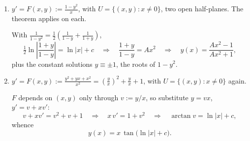 \begin{exercisesolution}
\begin{enumerate}[label=\textbf{(\alph*)}]
    Here $\frac{1}{1-e^y} = 1 + \frac{e^y}{1-e^y}$, so
    $\int\frac{dy}{1-e^y} = y - \ln\lvert 1-e^y\rvert$ and
    \[\ln\left\lvert\frac{e^y}{1-e^y}\right\rvert = x + c
      \quad\Longrightarrow\quad \frac{e^y}{1-e^y} = A e^{x}
      \quad\Longrightarrow\quad e^y = \frac{Ae^x}{1+Ae^x},\]
    that is
    \[y(x) = x + \ln\lvert A\rvert - \ln\!\big\lvert 1 + Ae^{x}\big\rvert,\]
    together with the constant solution $y \equiv 0$, the root of $1-e^y$. The sign of $A$
    selects the branch: $A > 0$ gives the solutions lying below the equilibrium, defined for
    every $x$, and $A < 0$ those lying above it, defined for $x > -\ln\lvert A\rvert$ and blowing
    up as $x$ descends to that endpoint. In both cases $y \to 0$ as $x \to \infty$, from below
    in the first and from above in the second, which the formula shows directly, since
    $\ln\lvert 1+Ae^x\rvert - x - \ln\lvert A\rvert \to 0$.

  \item $\displaystyle y' = F(x,y) := \frac{1-y^2}{x}$, with $U = \{(x,y) : x \neq 0\}$, two
    open half-planes. The theorem applies on each.

    With $\frac{1}{1-y^2} = \frac12\left(\frac{1}{1-y}+\frac{1}{1+y}\right)$,
    \[\tfrac12\ln\left\lvert\frac{1+y}{1-y}\right\rvert = \ln\lvert x\rvert + c
      \quad\Longrightarrow\quad \frac{1+y}{1-y} = A x^2
      \quad\Longrightarrow\quad y(x) = \frac{Ax^2-1}{Ax^2+1},\]
    plus the constant solutions $y \equiv \pm1$, the roots of $1-y^2$.

  \item $\displaystyle y' = F(x,y) := \frac{y^2+yx+x^2}{x^2}
      = \left(\frac{y}{x}\right)^{2} + \frac{y}{x} + 1$, with
    $U = \{(x,y) : x \neq 0\}$ again.

    $F$ depends on $(x,y)$ only through $v := y/x$, so substitute $y = vx$, $y' = v + xv'$:
    \[v + xv' = v^2+v+1 \quad\Longrightarrow\quad x\,v' = 1+v^2
      \quad\Longrightarrow\quad \arctan v = \ln\lvert x\rvert + c,\]
    whence
    \[y(x) = x\,\tan\!\big(\ln\lvert x\rvert + c\big).\]
\end{enumerate}


\end{exercisesolution}
